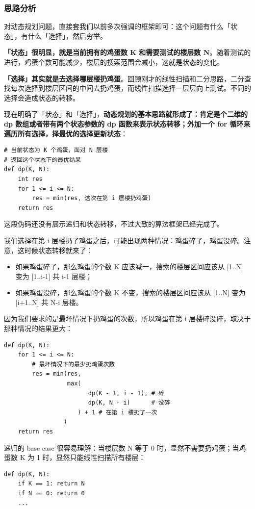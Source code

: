 \documentclass[12pt]{article}
\begin{document}
\subsubsection{思路分析}
对动态规划问题，直接套我们以前多次强调的框架即可：这个问题有什么「状态」，有什么「选择」，然后穷举。

\textbf{「状态」很明显，就是当前拥有的鸡蛋数 K 和需要测试的楼层数 N}。随着测试的进行，鸡蛋个数可能减少，楼层的搜索范围会减小，这就是状态的变化。

\textbf{「选择」其实就是去选择哪层楼扔鸡蛋}。回顾刚才的线性扫描和二分思路，二分查找每次选择到楼层区间的中间去扔鸡蛋，而线性扫描选择一层层向上测试。不同的选择会造成状态的转移。

现在明确了「状态」和「选择」，\textbf{动态规划的基本思路就形成了：肯定是个二维的 dp 数组或者带有两个状态参数的 dp 函数来表示状态转移；外加一个 for 循环来遍历所有选择，择最优的选择更新状态}：
\begin{lstlisting}
# 当前状态为 K 个鸡蛋，面对 N 层楼
# 返回这个状态下的最优结果
def dp(K, N):
    int res
    for 1 <= i <= N:
        res = min(res, 这次在第 i 层楼扔鸡蛋)
    return res
\end{lstlisting}
这段伪码还没有展示递归和状态转移，不过大致的算法框架已经完成了。

我们选择在第 i 层楼扔了鸡蛋之后，可能出现两种情况：鸡蛋碎了，鸡蛋没碎。注意，这时候状态转移就来了：
\begin{itemize}
\setlength{\itemsep}{0pt}
\setlength{\parsep}{0pt}
\setlength{\parskip}{0pt}
    \item 如果鸡蛋碎了，那么鸡蛋的个数 K 应该减一，搜索的楼层区间应该从 [1..N] 变为 [1..i-1] 共 i-1 层楼；
    \item 如果鸡蛋没碎，那么鸡蛋的个数 K 不变，搜索的楼层区间应该从 [1..N] 变为 [i+1..N] 共 N-i 层楼。
\end{itemize}

因为我们要求的是最坏情况下扔鸡蛋的次数，所以鸡蛋在第 i 层楼碎没碎，取决于那种情况的结果更大：
\begin{lstlisting}
def dp(K, N):
    for 1 <= i <= N:
        # 最坏情况下的最少扔鸡蛋次数
        res = min(res, 
                  max( 
                        dp(K - 1, i - 1), # 碎
                        dp(K, N - i)      # 没碎
                     ) + 1 # 在第 i 楼扔了一次
                 )
    return res
\end{lstlisting}

递归的 base case 很容易理解：当楼层数 N 等于 0 时，显然不需要扔鸡蛋；当鸡蛋数 K 为 1 时，显然只能线性扫描所有楼层：
\begin{lstlisting}
def dp(K, N):
    if K == 1: return N
    if N == 0: return 0
    ...
\end{lstlisting}
\end{document}
